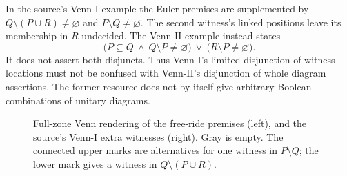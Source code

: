 In the source's Venn-I example the Euler premises are supplemented by
\(Q\setminus(P\cup R)\ne\varnothing\) and
\(P\setminus Q\ne\varnothing\). The second witness's linked
positions leave its membership in \(R\) undecided. The Venn-II
example instead states
\[
 \bigl(P\subseteq Q\ \land\ Q\setminus P\ne\varnothing\bigr)
 \ \lor\ \bigl(R\setminus P\ne\varnothing\bigr).
\]
It does not assert both disjuncts. Thus Venn-I's limited disjunction of
witness locations must not be confused with Venn-II's disjunction of
whole diagram assertions. The former resource does not by itself give
arbitrary Boolean combinations of unitary diagrams.

\begin{figure}[htbp]
\centering
{}
\caption{Full-zone Venn rendering of the free-ride premises (left),
and the source's Venn-I extra witnesses (right). Gray is empty.
The connected upper marks are alternatives for one witness in
\(P\setminus Q\); the lower mark gives a witness in
\(Q\setminus(P\cup R)\).}
\label{fig:p12-r131-venn}
\end{figure}

